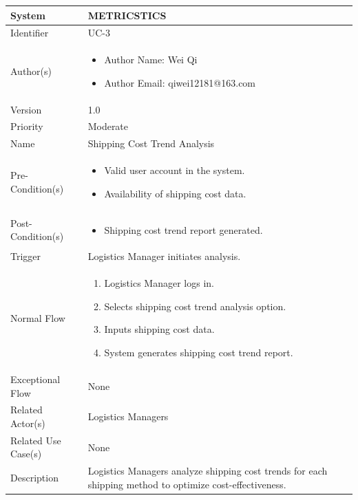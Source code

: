\begin{center}
	\begin{tabularx}{\textwidth}{|l|X|}
		\hline
		System & METRICSTICS \\
		\hline
		Identifier & UC-3 \\
		\hline
		Author(s) & \begin{itemize}[left=0pt]
			\item Author Name: Wei Qi
			\item Author Email: qiwei12181@163.com
		\end{itemize} \\
		\hline
		Version & 1.0 \\
		\hline
		Priority & Moderate \\
		\hline
		Name & Shipping Cost Trend Analysis \\
		\hline
		Pre-Condition(s) &  \begin{itemize}[left=0pt]
			\item Valid user account in the system.
			\item Availability of shipping cost data.
		\end{itemize} \\
		\hline
		Post-Condition(s) & \begin{itemize}[left=0pt]
			\item Shipping cost trend report generated.
		\end{itemize} \\
		\hline
		Trigger & Logistics Manager initiates analysis. \\
		\hline
		Normal Flow & \begin{enumerate}[left=0pt]
			\item Logistics Manager logs in.
			\item Selects shipping cost trend analysis option.
			\item Inputs shipping cost data.
			\item System generates shipping cost trend report.
		\end{enumerate} \\
		\hline
		Exceptional Flow & None \\
		\hline
		Related Actor(s) & Logistics Managers \\
		\hline
		Related Use Case(s) & None \\
		\hline
		Description & Logistics Managers analyze shipping cost trends for each shipping method to optimize cost-effectiveness. \\
		\hline
	\end{tabularx}
\end{center}

